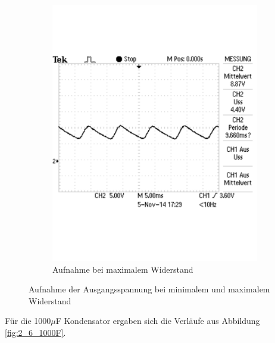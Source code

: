 \documentclass[12pt,a4paper]{article}
\begin{document}
\begin{figure}[H]
\begin{subfigure}[b]{0.48\textwidth}
                \includegraphics[width=\textwidth , scale = 0.4]{2_6_100F_2.pdf}
                \caption[Aufnahme bei maximalem Widerstand]{Aufnahme bei maximalem Widerstand}
  				\label{fig:2_6_100F_2}
        \end{subfigure}
        \caption{Aufnahme der Ausgangsspannung bei minimalem und maximalem Widerstand}
        \label{fig:2_6_100F}
\end{figure}

Für die 1000$\mu$F Kondensator ergaben sich die Verläufe aus Abbildung \ref{fig:2_6_1000F}.
\end{document}
